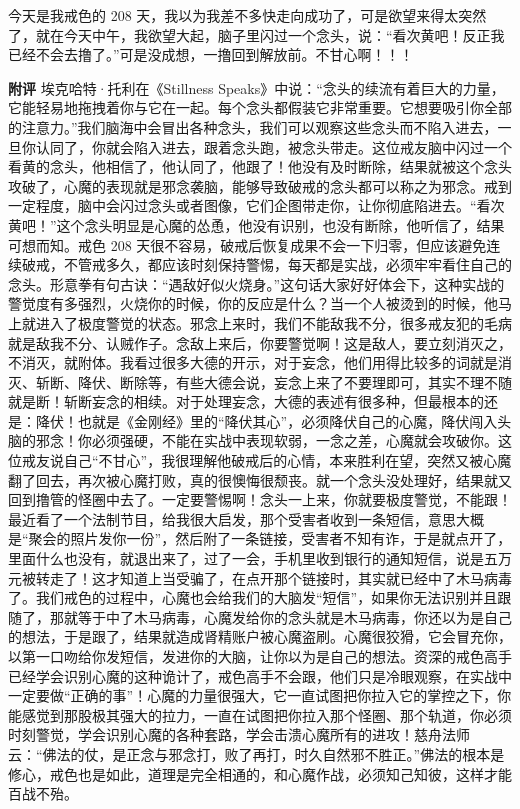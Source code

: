 \begin{case}
    今天是我戒色的 208 天，我以为我差不多快走向成功了，可是欲望来得太突然了，就在今天中午，我欲望大起，脑子里闪过一个念头，说：“看次黄吧！反正我已经不会去撸了。”可是没成想，一撸回到解放前。不甘心啊！！！

    \textbf{附评} 埃克哈特·托利在《Stillness Speaks》中说：“念头的续流有着巨大的力量，它能轻易地拖拽着你与它在一起。每个念头都假装它非常重要。它想要吸引你全部的注意力。”我们脑海中会冒出各种念头，我们可以观察这些念头而不陷入进去，一旦你认同了，你就会陷入进去，跟着念头跑，被念头带走。这位戒友脑中闪过一个看黄的念头，他相信了，他认同了，他跟了！他没有及时断除，结果就被这个念头攻破了，心魔的表现就是邪念袭脑，能够导致破戒的念头都可以称之为邪念。戒到一定程度，脑中会闪过念头或者图像，它们企图带走你，让你彻底陷进去。“看次黄吧！”这个念头明显是心魔的怂恿，他没有识别，也没有断除，他听信了，结果可想而知。戒色 208 天很不容易，破戒后恢复成果不会一下归零，但应该避免连续破戒，不管戒多久，都应该时刻保持警惕，每天都是实战，必须牢牢看住自己的念头。形意拳有句古诀：“遇敌好似火烧身。”这句话大家好好体会下，这种实战的警觉度有多强烈，火烧你的时候，你的反应是什么？当一个人被烫到的时候，他马上就进入了极度警觉的状态。邪念上来时，我们不能敌我不分，很多戒友犯的毛病就是敌我不分、认贼作子。念敌上来后，你要警觉啊！这是敌人，要立刻消灭之，不消灭，就附体。我看过很多大德的开示，对于妄念，他们用得比较多的词就是消灭、斩断、降伏、断除等，有些大德会说，妄念上来了不要理即可，其实不理不随就是断！斩断妄念的相续。对于处理妄念，大德的表述有很多种，但最根本的还是：降伏！也就是《金刚经》里的“降伏其心”，必须降伏自己的心魔，降伏闯入头脑的邪念！你必须强硬，不能在实战中表现软弱，一念之差，心魔就会攻破你。这位戒友说自己“不甘心”，我很理解他破戒后的心情，本来胜利在望，突然又被心魔翻了回去，再次被心魔打败，真的很懊悔很颓丧。就一个念头没处理好，结果就又回到撸管的怪圈中去了。一定要警惕啊！念头一上来，你就要极度警觉，不能跟！最近看了一个法制节目，给我很大启发，那个受害者收到一条短信，意思大概是“聚会的照片发你一份”，然后附了一条链接，受害者不知有诈，于是就点开了，里面什么也没有，就退出来了，过了一会，手机里收到银行的通知短信，说是五万元被转走了！这才知道上当受骗了，在点开那个链接时，其实就已经中了木马病毒了。我们戒色的过程中，心魔也会给我们的大脑发“短信”，如果你无法识别并且跟随了，那就等于中了木马病毒，心魔发给你的念头就是木马病毒，你还以为是自己的想法，于是跟了，结果就造成肾精账户被心魔盗刷。心魔很狡猾，它会冒充你，以第一口吻给你发短信，发进你的大脑，让你以为是自己的想法。资深的戒色高手已经学会识别心魔的这种诡计了，戒色高手不会跟，他们只是冷眼观察，在实战中一定要做“正确的事”！心魔的力量很强大，它一直试图把你拉入它的掌控之下，你能感觉到那股极其强大的拉力，一直在试图把你拉入那个怪圈、那个轨道，你必须时刻警觉，学会识别心魔的各种套路，学会击溃心魔所有的进攻！慈舟法师云：“佛法的仗，是正念与邪念打，败了再打，时久自然邪不胜正。”佛法的根本是修心，戒色也是如此，道理是完全相通的，和心魔作战，必须知己知彼，这样才能百战不殆。
\end{case}

